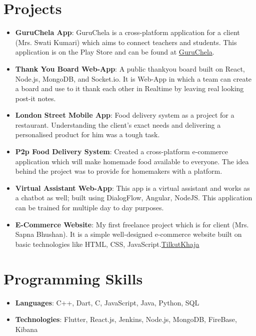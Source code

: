 \documentclass[a4paper,11pt]{article}
\newcommand{\projectItem}[2]{
  \item\small{
    \textbf{#1}{: #2 \vspace{-2pt}}
  }
}
\newcommand{\resumeSubHeadingListStart}{\begin{itemize}[leftmargin=*]}
\newcommand{\resumeSubHeadingListEnd}{\end{itemize}}
\begin{document}
\section{Projects}
  \resumeSubHeadingListStart
    \projectItem{GuruChela App}
      {GuruChela is a cross-platform application for a client (Mrs. Swati Kumari) which aims to connect teachers and students. This application is on the Play Store and can be found at \href{http://bit.ly/GuruChela}{\textcolor{BurntOrange}{GuruChela}}.}
    \projectItem{Thank You Board Web-App}
      {A public thankyou board built on React, Node.js, MongoDB, and Socket.io. It is Web-App in which a team can create a board and use to it thank each other in Realtime by leaving real looking post-it notes.}
    \projectItem{London Street Mobile App}
      {Food delivery system as a project for a restaurant. Understanding the client's exact needs and delivering a personalised product for him was a tough task.}
    \projectItem{P2p Food Delivery System}
      {Created a cross-platform e-commerce application which will make homemade food available to everyone. The idea behind the project was to provide for homemakers with a platform.}
    \projectItem{Virtual Assistant Web-App}
      {This app is a virtual assistant and works as a chatbot as well; built using DialogFlow, Angular, NodeJS. This application can be trained for multiple day to day purposes.}
    \projectItem{E-Commerce Website}
      {My first freelance project which is for client (Mrs. Sapna Bhushan). It is a simple well-designed e-commerce website built on basic technologies like HTML, CSS, JavaScript.\href{https://www.tilkutkhaja.com/}{\textcolor{BurntOrange}{TilkutKhaja}}}

  \resumeSubHeadingListEnd

%
\section{Programming Skills}
 \resumeSubHeadingListStart
   \item{
     \textbf{Languages}{: C++, Dart, C, JavaScript, Java, Python, SQL}
     
   }
   \item{
     \textbf{Technologies}{: Flutter, React.js, Jenkins, Node.js, MongoDB, FireBase, Kibana }
   }
   
   
 \resumeSubHeadingListEnd


\end{document}

